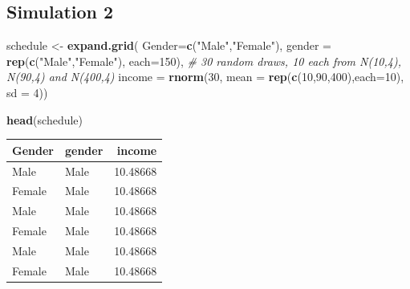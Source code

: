 \documentclass[
]{article}
\newenvironment{Shaded}{\begin{snugshade}}{\end{snugshade}}
\newcommand{\AttributeTok}[1]{\textcolor[rgb]{0.13,0.29,0.53}{#1}}
\newcommand{\CommentTok}[1]{\textcolor[rgb]{0.56,0.35,0.01}{\textit{#1}}}
\newcommand{\DecValTok}[1]{\textcolor[rgb]{0.00,0.00,0.81}{#1}}
\newcommand{\FunctionTok}[1]{\textcolor[rgb]{0.13,0.29,0.53}{\textbf{#1}}}
\newcommand{\NormalTok}[1]{#1}
\newcommand{\OtherTok}[1]{\textcolor[rgb]{0.56,0.35,0.01}{#1}}
\newcommand{\StringTok}[1]{\textcolor[rgb]{0.31,0.60,0.02}{#1}}
\begin{document}
\hypertarget{simulation-2}{%
\subsection{Simulation 2}\label{simulation-2}}

\begin{Shaded}
\begin{Highlighting}[]
\NormalTok{schedule }\OtherTok{\textless{}{-}} \FunctionTok{expand.grid}\NormalTok{(}
  \AttributeTok{Gender=}\FunctionTok{c}\NormalTok{(}\StringTok{"Male"}\NormalTok{,}\StringTok{"Female"}\NormalTok{),}
          \AttributeTok{gender =} \FunctionTok{rep}\NormalTok{(}\FunctionTok{c}\NormalTok{(}\StringTok{"Male"}\NormalTok{,}\StringTok{"Female"}\NormalTok{), }\AttributeTok{each=}\DecValTok{150}\NormalTok{),}
  \CommentTok{\# 30 random draws, 10 each from N(10,4), N(90,4) and N(400,4)}
\AttributeTok{income =} \FunctionTok{rnorm}\NormalTok{(}\DecValTok{30}\NormalTok{, }\AttributeTok{mean =} \FunctionTok{rep}\NormalTok{(}\FunctionTok{c}\NormalTok{(}\DecValTok{10}\NormalTok{,}\DecValTok{90}\NormalTok{,}\DecValTok{400}\NormalTok{),}\AttributeTok{each=}\DecValTok{10}\NormalTok{), }\AttributeTok{sd =} \DecValTok{4}\NormalTok{))}


\FunctionTok{head}\NormalTok{(schedule)}
\end{Highlighting}
\end{Shaded}

\begin{longtable}[]{@{}llr@{}}
\toprule\noalign{}
Gender & gender & income \\
\midrule\noalign{}
\endhead
\bottomrule\noalign{}
\endlastfoot
Male & Male & 10.48668 \\
Female & Male & 10.48668 \\
Male & Male & 10.48668 \\
Female & Male & 10.48668 \\
Male & Male & 10.48668 \\
Female & Male & 10.48668 \\
\end{longtable}
\end{document}
